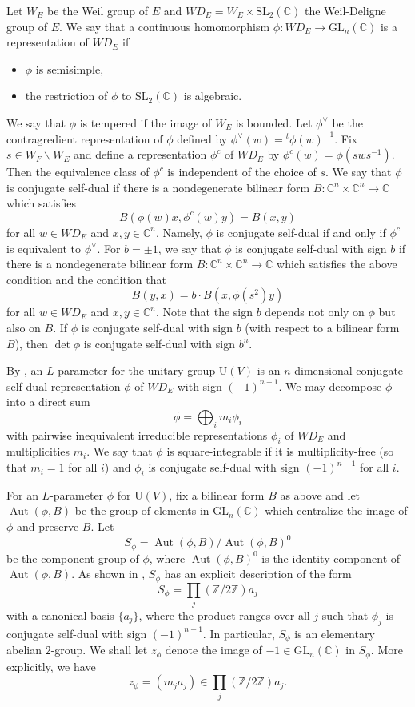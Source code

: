 \documentclass[11pt]{amsart}
\numberwithin{equation}{section}
\theoremstyle{plain}
\theoremstyle{definition}
\theoremstyle{remark}
\def\Aut{\operatorname{Aut}}
\def\GL{\mathrm{GL}}
\def\SL{\mathrm{SL}}
\def\U{\mathrm{U}}
\def\WD{\mathit{WD}}
\def\CC{\mathbb{C}}
\def\ZZ{\mathbb{Z}}
\begin{document}
Let $W_E$ be the Weil group of $E$ and $\WD_E = W_E \times \SL_2(\CC)$ the Weil-Deligne group of $E$.
We say that a continuous homomorphism $\phi: \WD_E \rightarrow \GL_n(\CC)$ is a representation of $\WD_E$ if 
\begin{itemize}
 \item $\phi$ is semisimple, 
 \item the restriction of $\phi$ to $\SL_2(\CC)$ is algebraic.
\end{itemize}
We say that $\phi$ is tempered if the image of $W_E$ is bounded.
Let $\phi^{\vee}$ be the contragredient representation of $\phi$ defined by $\phi^\vee(w) = {}^t\phi(w)^{-1}$.
Fix $s \in W_F \smallsetminus W_E$ and define a representation $\phi^c$ of $\WD_E$ by $\phi^c(w) = \phi(sws^{-1})$.
Then the equivalence class of $\phi^c$ is independent of the choice of $s$.
We say that $\phi$ is conjugate self-dual if there is a nondegenerate bilinear form $B : \CC^n \times \CC^n \rightarrow \CC$ which satisfies
\[
 B(\phi(w) x, \phi^c(w) y) = B(x, y)
\]
for all $w \in \WD_E$ and $x, y \in \CC^n$.
Namely, $\phi$ is conjugate self-dual if and only if $\phi^c$ is equivalent to $\phi^\vee$.
For $b = \pm 1$, we say that $\phi$ is conjugate self-dual with sign $b$ if there is a nondegenerate bilinear form $B : \CC^n \times \CC^n \rightarrow \CC$ which satisfies the above condition and the condition that 
\[
 B(y, x) = b \cdot B(x, \phi(s^2) y)
\]
for all $w \in \WD_E$ and $x, y \in \CC^n$.
Note that the sign $b$ depends not only on $\phi$ but also on $B$.
If $\phi$ is conjugate self-dual with sign $b$ (with respect to a bilinear form $B$), 
then $\det \phi$ is conjugate self-dual with sign $b^n$.

By \cite[\S 8]{ggp1}, an $L$-parameter for the unitary group $\U(V)$ is an $n$-dimensional conjugate self-dual representation $\phi$ of $\WD_E$ with sign $(-1)^{n-1}$.
We may decompose $\phi$ into a direct sum
\[  \phi = \bigoplus_i m_i \phi_i \]
with pairwise inequivalent irreducible representations $\phi_i$ of $\WD_E$ and multiplicities $m_i$.
We say that $\phi$ is square-integrable if it is multiplicity-free (so that $m_i=1$ for all $i$) and $\phi_i$ is conjugate self-dual with sign $(-1)^{n-1}$ for all $i$.

For an $L$-parameter $\phi$ for $\U(V)$, fix a bilinear form $B$ as above and let $\Aut(\phi,B)$ be the group of elements in $\GL_n(\CC)$ which centralize the image of $\phi$ and preserve $B$.
Let
\[  S_{\phi}  = \Aut(\phi, B) / \Aut(\phi, B)^0 \]
be the component group of $\phi$, 
where $\Aut(\phi, B)^0$ is the identity component of $\Aut(\phi, B)$.
As shown in \cite[\S 8]{ggp1}, $S_{\phi}$ has an explicit description of the form
\[  S_{\phi}  = \prod_j  (\ZZ / 2\ZZ) a_j \]
with a canonical basis $\{ a_j \}$, where the product ranges over all $j$ such that $\phi_j$ is conjugate self-dual with sign $(-1)^{n-1}$.
In particular, $S_{\phi}$ is an elementary abelian $2$-group.
We shall let $z_\phi$ denote the image of $-1 \in \GL_n(\CC)$ in $S_\phi$.
More explicitly, we have
\[
 z_{\phi} = (m_j a_j) \in \prod_j  (\ZZ / 2\ZZ) a_j.
\]
\end{document}
